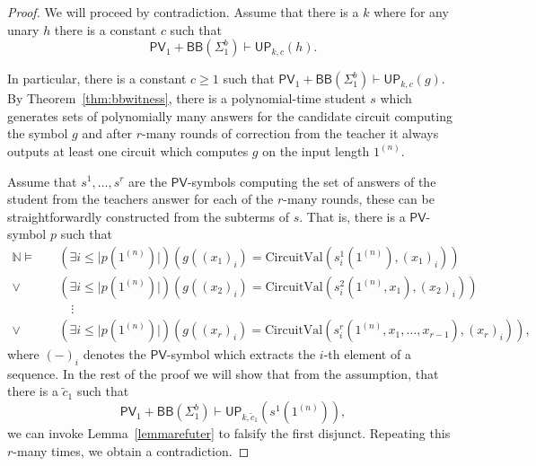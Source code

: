 \documentclass[10pt,a4paper]{amsart}
\newcommand{\CircuitVal}{\text{CircuitVal}}
\newcommand{\PV}{\mathsf{PV}}
\newcommand{\UP}{\mathsf{UP}}
\newcommand{\abs}[1]{\lvert #1 \rvert}
\begin{document}
\begin{proof}
    We will proceed by contradiction. Assume that there is a $k$ where for any unary $h$ there is a constant $c$ such that \[\PV_1+\mathsf{BB}(\Sigma^b_1)\vdash \UP_{k,c}(h).\]

    In particular, there is a constant $c\geq1$ such that $\PV_1+\mathsf{BB}(\Sigma^b_1)\vdash \UP_{k,c}(g).$ By Theorem~\ref{thm:bbwitness}, there is a polynomial-time student $s$ which generates sets of polynomially many answers for the candidate circuit computing the symbol $g$ and after $r$-many rounds of correction from the teacher it always outputs at least one circuit which computes $g$ on the input length $1^{(n)}$. 
    
    Assume that $s^1,\dots,s^{r}$ are the $\PV$-symbols computing the set of answers of the student from the teachers answer for each of the $r$-many rounds, these can be straightforwardly constructed from the subterms of $s$. That is, there is a $\PV$-symbol $p$ such that
    \begin{align*}
        \mathbb{N}\models \quad&(\exists i\leq \abs{p(1^{(n)})})(g((x_1)_i)=\CircuitVal(s^1_i(1^{(n)}),(x_1)_i))\\
                          \lor&(\exists i\leq \abs{p(1^{(n)})})(g((x_2)_i)=\CircuitVal(s^2_i(1^{(n)},x_1),(x_2)_i))\\
                          &\quad\vdots\\
                          \lor&(\exists i\leq \abs{p(1^{(n)})})(g((x_r)_i)=\CircuitVal(s^r_i(1^{(n)},x_1,\dots,x_{r-1}),(x_{r})_i)),
    \end{align*}
    where $(-)_i$ denotes the $\PV$-symbol which extracts the $i$-th element of a sequence. In the rest of the proof we will show that from the assumption, that there is a $\tilde c_1$ such that \[\PV_1+\mathsf{BB}(\Sigma^b_1)\vdash \UP_{k,\tilde c_1}(s^1(1^{(n)})),\] we can invoke Lemma~\ref{lemmarefuter} to falsify the first disjunct. Repeating this $r$-many times, we obtain a contradiction.
    

\end{proof}
\end{document}
